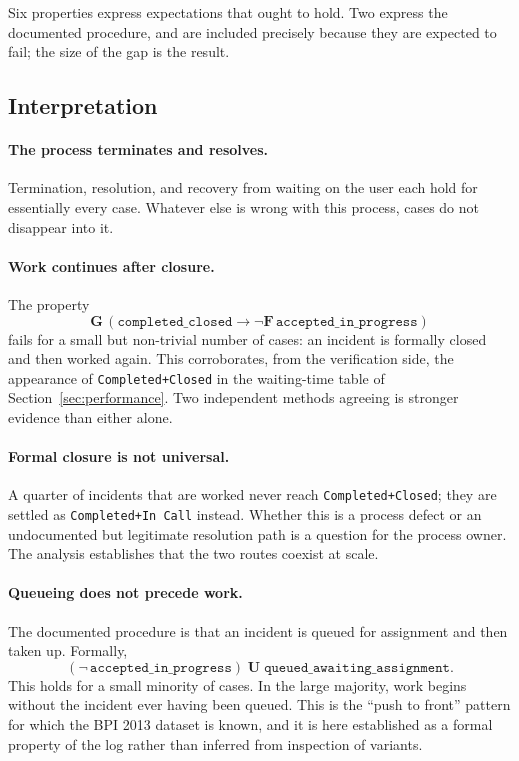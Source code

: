 \documentclass[12pt,a4paper]{article}
\newcommand{\act}[1]{\texttt{#1}}
\begin{document}
Six properties express expectations that ought to hold. Two express the
documented procedure, and are included precisely because they are expected to
fail; the size of the gap is the result.

\begin{table}[H]
\centering
\small

\caption{Verification against all cases of the incident log.}
\label{tab:ltl}
\end{table}

\subsection{Interpretation}

\paragraph{The process terminates and resolves.} Termination, resolution, and
recovery from waiting on the user each hold for essentially every case. Whatever
else is wrong with this process, cases do not disappear into it.

\paragraph{Work continues after closure.} The property
\[
  \mathbf{G}\,(\texttt{completed\_closed} \rightarrow
  \neg\mathbf{F}\,\texttt{accepted\_in\_progress})
\]
fails for a small but non-trivial number of cases: an incident is formally
closed and then worked again. This corroborates, from the verification side, the
appearance of \act{Completed+Closed} in the waiting-time table of
Section~\ref{sec:performance}. Two independent methods agreeing is stronger
evidence than either alone.

\paragraph{Formal closure is not universal.} A quarter of incidents that are
worked never reach \act{Completed+Closed}; they are settled as
\act{Completed+In Call} instead. Whether this is a process defect or an
undocumented but legitimate resolution path is a question for the process owner.
The analysis establishes that the two routes coexist at scale.

\paragraph{Queueing does not precede work.} The documented procedure is that an
incident is queued for assignment and then taken up. Formally,
\[
  (\neg\,\texttt{accepted\_in\_progress}) \;\mathbf{U}\;
  \texttt{queued\_awaiting\_assignment}.
\]
This holds for a small minority of cases. In the large majority, work begins
without the incident ever having been queued. This is the ``push to front''
pattern for which the BPI 2013 dataset is known, and it is here established as a
formal property of the log rather than inferred from inspection of variants.
\end{document}
